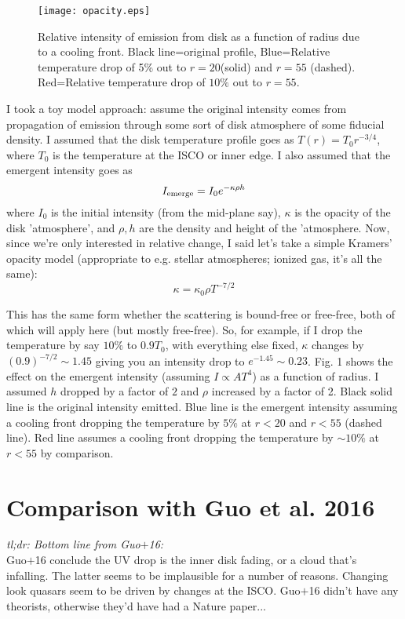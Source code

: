 \documentclass[12pt]{article}
\begin{document}
\begin{figure}
\begin{center}
\texttt{[image: opacity.eps]}
\end{center}
\caption[]{Relative intensity of emission from disk as a function of radius due to a cooling front. Black line=original profile, Blue=Relative temperature drop of 5\% out to $r=20$(solid) and $r=55$ (dashed). Red=Relative temperature drop of $10\%$ out to $r=55$. 
\label{fig:rayleigh1}}
\end{figure}

I took a toy model approach: assume the original intensity comes from propagation of emission through some sort of disk atmosphere of some fiducial density. I assumed that the disk temperature profile goes as $T(r)=T_{0}r^{-3/4}$, where $T_{0}$ is the temperature at the ISCO or inner edge. I also assumed that the emergent intensity goes as
\begin{equation}
I_{\rm emerge}=I_{0} e^{-\kappa \rho h}
\end{equation}
where $I_{0}$ is the initial intensity (from the mid-plane say), $\kappa$ is the opacity of the disk 'atmosphere', and $\rho,h$ are the density and height of the 'atmosphere. Now, since we're only interested in relative change, I said let's take a simple Kramers' opacity model (appropriate to e.g. stellar atmospheres; ionized gas, it's all the same):
\begin{equation}
\kappa = \kappa_{0} \rho T^{-7/2}
\end{equation}

This has the same form whether the scattering is bound-free or free-free, both of which will apply here (but mostly free-free). So, for example, if I drop the temperature by say $10\%$ to $0.9T_{0}$, with everything else fixed, $\kappa$ changes by $(0.9)^{-7/2} \sim 1.45$ giving you an intensity drop to $e^{-1.45}\sim 0.23$. Fig. 1 shows the effect on the emergent intensity (assuming $I \propto AT^{4}$) as a function of radius. I assumed $h$ dropped by a factor of $2$ and $\rho$ increased by a factor of 2. Black solid line is the original intensity emitted. Blue line is the emergent intensity assuming a cooling front dropping the temperature by $5\%$ at $r<20$ and $r<55$ (dashed line). Red line assumes a cooling front dropping the temperature by $\sim 10\%$ at $r<55$ by comparison.

\section{Comparison with Guo et al. 2016}
\emph{tl;dr: Bottom line from Guo$+$16:}\\
Guo$+$16 conclude the UV drop is the inner disk fading, or a cloud that's infalling. The latter seems to be implausible for a number of reasons. Changing look quasars seem to be driven by changes at the ISCO. Guo$+$16 didn't have any theorists, otherwise they'd have had a Nature paper...
\end{document}
